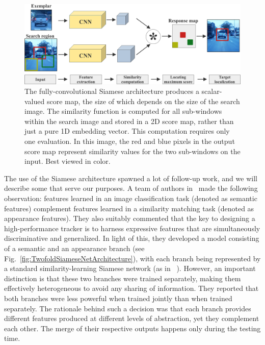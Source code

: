 \begin{figure}[t]
    \centerline{\includegraphics[width=0.7\linewidth]{figures/theoretical_foundations/fully_cnn_siam_tracking_architecture.pdf}}
    \caption[ architecture]{The fully-convolutional Siamese architecture produces a scalar-valued score map, the size of which depends on the size of the search image. The similarity function is computed for all sub-windows within the search image and stored in a 2D score map, rather than just a pure 1D embedding vector. This computation requires only one evaluation. In this image, the red and blue pixels in the output score map represent similarity values for the two sub-windows on the input. Best viewed in color. }
    \label{fig:FullyCNNSiamTrackingArch}
\end{figure}

The use of the Siamese architecture spawned a lot of follow-up work, and we will describe some that serve our purposes. A team of authors in~\cite{He2018} made the following observation: features learned in an image classification task (denoted as semantic features) complement features learned in a similarity matching task (denoted as appearance features). They also suitably commented that the key to designing a high-performance tracker is to harness expressive features that are simultaneously discriminative and generalized. In light of this, they developed a model consisting of a semantic and an appearance branch (see Fig.~\ref{fig:TwofoldSiameseNetArchitecture}), with each branch being represented by a standard similarity-learning Siamese network (as in ~\cite{Bertinetto2016}). However, an important distinction is that these two branches were trained separately, making them effectively heterogeneous to avoid any sharing of information. They reported that both branches were less powerful when trained jointly than when trained separately. The rationale behind such a decision was that each branch provides different features produced at different levels of abstraction, yet they complement each other. The merge of their respective outputs happens only during the testing time.

